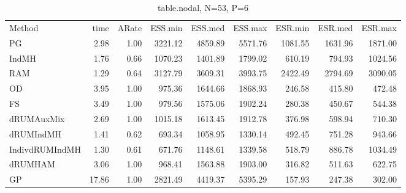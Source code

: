 
\begin{table}
\label{tab:blogit-nodal}
\begin{tabular}{l r r r r r r r r } 
          Method  &     time &    ARate &  ESS.min &  ESS.med &  ESS.max &  ESR.min &  ESR.med &  ESR.max \\ 
              PG  &     2.98 &     1.00 &  3221.12 &  4859.89 &  5571.76 &  1081.55 &  1631.96 &  1871.00 \\ 
           IndMH  &     1.76 &     0.66 &  1070.23 &  1401.89 &  1799.02 &   610.19 &   794.93 &  1024.56 \\ 
             RAM  &     1.29 &     0.64 &  3127.79 &  3609.31 &  3993.75 &  2422.49 &  2794.69 &  3090.05 \\ 
              OD  &     3.95 &     1.00 &   975.36 &  1644.66 &  1868.93 &   246.58 &   415.80 &   472.48 \\ 
              FS  &     3.49 &     1.00 &   979.56 &  1575.06 &  1902.24 &   280.38 &   450.67 &   544.38 \\ 
      dRUMAuxMix  &     2.69 &     1.00 &  1015.18 &  1613.45 &  1912.78 &   376.98 &   598.94 &   710.30 \\ 
       dRUMIndMH  &     1.41 &     0.62 &   693.34 &  1058.95 &  1330.14 &   492.45 &   751.28 &   943.66 \\ 
  IndivdRUMIndMH  &     1.30 &     0.61 &   671.76 &  1148.61 &  1339.58 &   518.79 &   886.78 &  1034.49 \\ 
         dRUMHAM  &     3.06 &     1.00 &   968.41 &  1563.88 &  1903.00 &   316.82 &   511.63 &   622.75 \\ 
              GP  &    17.86 &     1.00 &  2821.49 &  4419.37 &  5395.29 &   157.93 &   247.38 &   302.00
 \end{tabular}
\caption{table.nodal, N=53, P=6}
\end{table}

